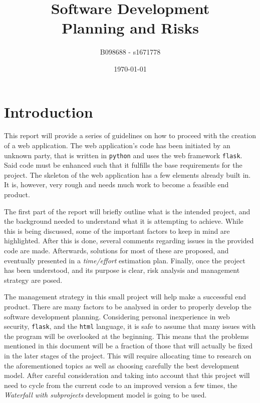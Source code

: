 \documentclass[12pt,a4paper]{article}
\begin{document}
\title{Software Development\\Planning and Risks}
\author{B098688 - s1671778}
\date{\today}

\makeEPCCtitle

\thispagestyle{empty}

\newpage


\tableofcontents


\newpage
{}

\section{Introduction}

This report will provide a series of guidelines on how to proceed with the creation of a web application. The web application's code has been initiated by an unknown party, that is written in \texttt{python} and uses the web framework \texttt{flask}. Said code must be enhanced such that it fulfills the base requirements for the project. The skeleton of the web application has a few elements already built in. It is, however, very rough and needs much work to become a feasible end product. 

The first part of the report will briefly outline what is the intended project, and the background needed to understand what it is attempting to achieve. While this is being discussed, some of the important factors to keep in mind are highlighted. After this is done, several comments regarding issues in the provided code are made. Afterwards, solutions for most of these are proposed, and eventually presented in a \textit{time/effort} estimation plan. Finally, once the project has been understood, and its purpose is clear, risk analysis and management strategy are posed.

The management strategy in this small project will help make a successful end product. There are many factors to be analysed in order to properly develop the software development planning. Considering personal inexperience in web security, \texttt{flask}, and the \texttt{html} language, it is safe to assume that many issues with the program will be overlooked at the beginning. This means that the problems mentioned in this document will be a fraction of those that will actually be fixed in the later stages of the project. This will require allocating time to research on the aforementioned topics as well as choosing carefully the best development model. After careful consideration and taking into account that this project will need to cycle from the current code to an improved version a few times, the \textit{Waterfall with subprojects} development model is going to be used.
\end{document}

